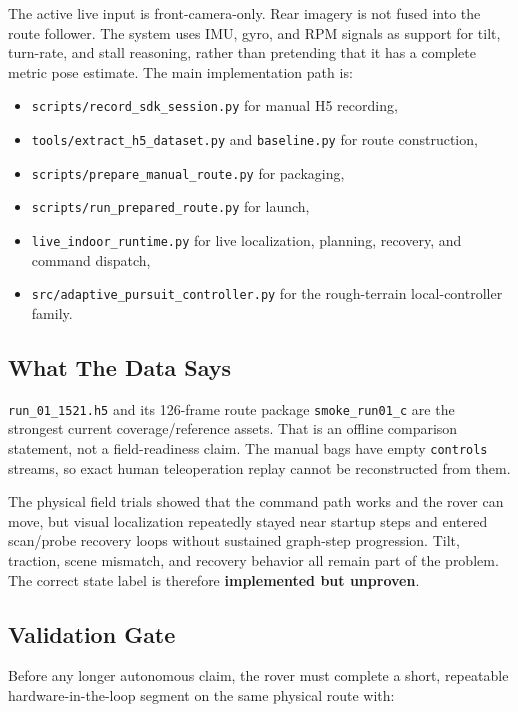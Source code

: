 \documentclass[11pt]{article}
\begin{document}
The active live input is front-camera-only. Rear imagery is not fused into the
route follower. The system uses IMU, gyro, and RPM signals as support for tilt,
turn-rate, and stall reasoning, rather than pretending that it has a complete
metric pose estimate. The main implementation path is:

\begin{itemize}[nosep]
  \item \texttt{scripts/record\_sdk\_session.py} for manual H5 recording,
  \item \texttt{tools/extract\_h5\_dataset.py} and \texttt{baseline.py} for
  route construction,
  \item \texttt{scripts/prepare\_manual\_route.py} for packaging,
  \item \texttt{scripts/run\_prepared\_route.py} for launch,
  \item \texttt{live\_indoor\_runtime.py} for live localization, planning,
  recovery, and command dispatch,
  \item \texttt{src/adaptive\_pursuit\_controller.py} for the rough-terrain
  local-controller family.
\end{itemize}

\subsection{What The Data Says}

\texttt{run\_01\_1521.h5} and its 126-frame route package
\texttt{smoke\_run01\_c} are the strongest current coverage/reference assets.
That is an offline comparison statement, not a field-readiness claim. The manual
bags have empty \texttt{controls} streams, so exact human teleoperation replay
cannot be reconstructed from them.

The physical field trials showed that the command path works and the rover can
move, but visual localization repeatedly stayed near startup steps and entered
scan/probe recovery loops without sustained graph-step progression. Tilt,
traction, scene mismatch, and recovery behavior all remain part of the problem.
The correct state label is therefore \textbf{implemented but unproven}.

\subsection{Validation Gate}

Before any longer autonomous claim, the rover must complete a short,
repeatable hardware-in-the-loop segment on the same physical route with:
\end{document}
